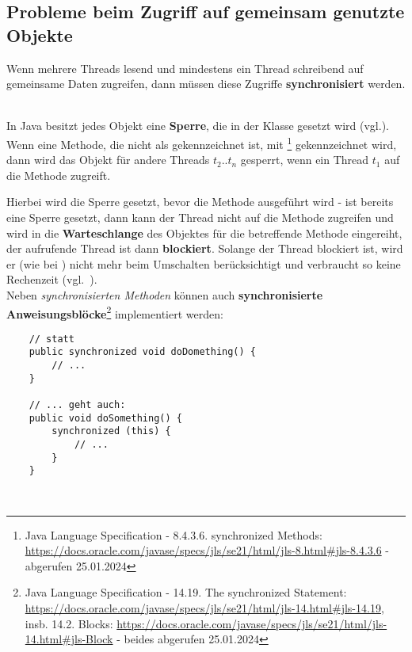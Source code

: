 \subsection{Probleme beim Zugriff auf gemeinsam genutzte Objekte}

\begin{tcolorbox}
   Wenn mehrere Threads lesend und mindestens ein Thread schreibend auf gemeinsame Daten zugreifen, dann müssen diese Zugriffe \textbf{synchronisiert} werden.
\end{tcolorbox}\\

In Java besitzt jedes Objekt eine \textbf{Sperre}, die in der Klasse  gesetzt wird (vgl.\cite[26]{Oec22}).\\

Wenn eine Methode, die nicht als  gekennzeichnet ist, mit \footnote{
    Java Language Specification - 8.4.3.6. synchronized Methods: \url{https://docs.oracle.com/javase/specs/jls/se21/html/jls-8.html#jls-8.4.3.6} - abgerufen 25.01.2024
} gekennzeichnet wird, dann wird das Objekt für andere Threads $t_2..t_n$ gesperrt, wenn ein Thread $t_1$ auf die Methode zugreift.

Hierbei wird die Sperre gesetzt, bevor die Methode ausgeführt wird - ist bereits eine Sperre gesetzt, dann kann der Thread nicht auf die Methode zugreifen und wird in die \textbf{Warteschlange} des Objektes für die betreffende Methode eingereiht, der aufrufende Thread ist dann \textbf{blockiert}.
Solange der Thread blockiert ist, wird er (wie bei ) nicht mehr beim Umschalten berücksichtigt und verbraucht so keine Rechenzeit (vgl.~\cite[26]{Oec22}).
\\

Neben \textit{synchronisierten Methoden} können auch \textbf{synchronisierte Anweisungsblöcke}\footnote{
Java Language Specification - 14.19. The synchronized Statement: \url{https://docs.oracle.com/javase/specs/jls/se21/html/jls-14.html#jls-14.19}, insb. 14.2. Blocks: \url{https://docs.oracle.com/javase/specs/jls/se21/html/jls-14.html#jls-Block} - beides abgerufen 25.01.2024
} implementiert werden:\\

\begin{verbatim}
    // statt
    public synchronized void doDomething() {
        // ...
    }

    // ... geht auch:
    public void doSomething() {
        synchronized (this) {
            // ...
        }
    }
\end{verbatim}\\

